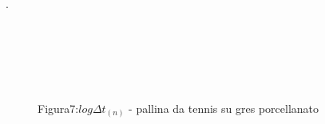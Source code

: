 \documentclass[a4paper]{article}
\theoremstyle{definition}
\begin{document}
.\\\\\\\\\\\\
	\begin{figure}[!ht]
				\captionsetup{labelformat=empty}
		\caption{Figura7:\(log\Delta t _{(n)}\) - pallina da tennis su gres porcellanato}
	\end{figure}
	
\end{document}
